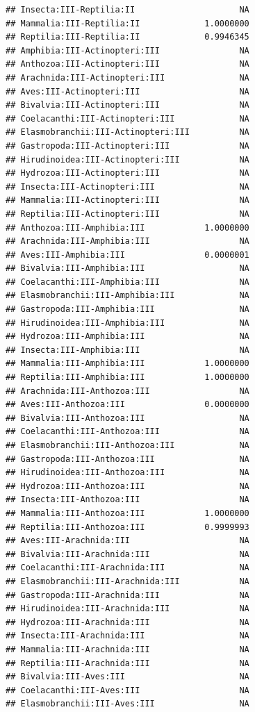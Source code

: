 \documentclass[
  12pt,
]{article}
\begin{document}
\begin{verbatim}
## Insecta:III-Reptilia:II                     NA
## Mammalia:III-Reptilia:II             1.0000000
## Reptilia:III-Reptilia:II             0.9946345
## Amphibia:III-Actinopteri:III                NA
## Anthozoa:III-Actinopteri:III                NA
## Arachnida:III-Actinopteri:III               NA
## Aves:III-Actinopteri:III                    NA
## Bivalvia:III-Actinopteri:III                NA
## Coelacanthi:III-Actinopteri:III             NA
## Elasmobranchii:III-Actinopteri:III          NA
## Gastropoda:III-Actinopteri:III              NA
## Hirudinoidea:III-Actinopteri:III            NA
## Hydrozoa:III-Actinopteri:III                NA
## Insecta:III-Actinopteri:III                 NA
## Mammalia:III-Actinopteri:III                NA
## Reptilia:III-Actinopteri:III                NA
## Anthozoa:III-Amphibia:III            1.0000000
## Arachnida:III-Amphibia:III                  NA
## Aves:III-Amphibia:III                0.0000001
## Bivalvia:III-Amphibia:III                   NA
## Coelacanthi:III-Amphibia:III                NA
## Elasmobranchii:III-Amphibia:III             NA
## Gastropoda:III-Amphibia:III                 NA
## Hirudinoidea:III-Amphibia:III               NA
## Hydrozoa:III-Amphibia:III                   NA
## Insecta:III-Amphibia:III                    NA
## Mammalia:III-Amphibia:III            1.0000000
## Reptilia:III-Amphibia:III            1.0000000
## Arachnida:III-Anthozoa:III                  NA
## Aves:III-Anthozoa:III                0.0000000
## Bivalvia:III-Anthozoa:III                   NA
## Coelacanthi:III-Anthozoa:III                NA
## Elasmobranchii:III-Anthozoa:III             NA
## Gastropoda:III-Anthozoa:III                 NA
## Hirudinoidea:III-Anthozoa:III               NA
## Hydrozoa:III-Anthozoa:III                   NA
## Insecta:III-Anthozoa:III                    NA
## Mammalia:III-Anthozoa:III            1.0000000
## Reptilia:III-Anthozoa:III            0.9999993
## Aves:III-Arachnida:III                      NA
## Bivalvia:III-Arachnida:III                  NA
## Coelacanthi:III-Arachnida:III               NA
## Elasmobranchii:III-Arachnida:III            NA
## Gastropoda:III-Arachnida:III                NA
## Hirudinoidea:III-Arachnida:III              NA
## Hydrozoa:III-Arachnida:III                  NA
## Insecta:III-Arachnida:III                   NA
## Mammalia:III-Arachnida:III                  NA
## Reptilia:III-Arachnida:III                  NA
## Bivalvia:III-Aves:III                       NA
## Coelacanthi:III-Aves:III                    NA
## Elasmobranchii:III-Aves:III                 NA

\end{verbatim}
\end{document}

